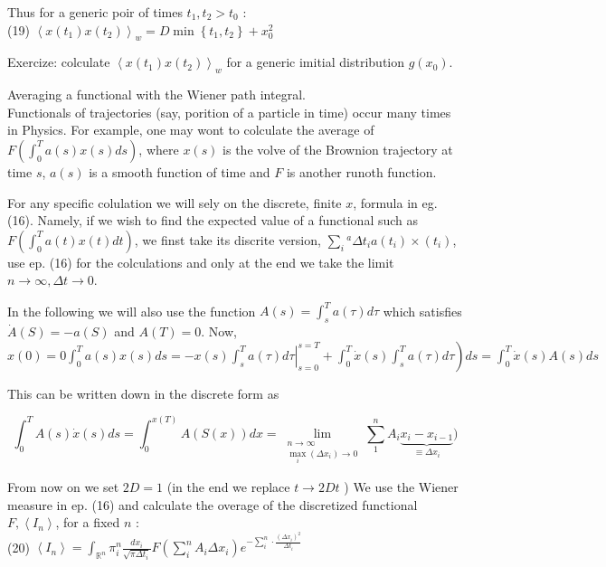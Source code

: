 \documentclass[10pt]{article}
\begin{document}
Thus for a generic poir of times $t_{1}, t_{2}>t_{0}$ :\\
(19) $\left\langle x\left(t_{1}\right) x\left(t_{2}\right)\right\rangle_{w}=D \min \left\{t_{1}, t_{2}\right\}+x_{0}^{2}$

Exercize: colculate $\left\langle x\left(t_{1}\right) x\left(t_{2}\right)\right\rangle_{w}$ for a generic imitial distribution $g\left(x_{0}\right)$.

Averaging a functional with the Wiener path integral.\\
Functionals of trajectories (say, porition of a particle in time) occur many times in Physics. For example, one may wont to colculate the average of $F\left(\int_{0}^{T} a(s) x(s) d s\right)$, where $x(s)$ is the volve of the Brownion trajectory at time $s$, $a(s)$ is a smooth function of time and $F$ is another runoth function.

For any specific colulation we will sely on the discrete, finite $x$, formula in eg. (16). Namely, if we wish to find the expected value of a functional such as $F\left(\int_{0}^{T} a(t) x(t) d t\right)$, we finst take its discrite version, $\sum_{i}{ }^{a} \Delta t_{i} a\left(t_{i}\right) \times\left(t_{i}\right)$, use ep. (16) for the colculations and only at the end we take the limit $n \rightarrow \infty, \Delta t \rightarrow 0$.

In the following we will also use the function $A(s)=\int_{s}^{T} a(\tau) d \tau$ which satisfies $\dot{A}(S)=-a(S)$ and $A(T)=0$. Now, $x(0)=0 \left.\int_{0}^{T} a(s) x(s) d s=-\left.x(s) \int_{s}^{T} a(\tau) d \tau\right|_{s=0} ^{s=T}+\int_{0}^{T} \dot{x}(s) \int_{s}^{T} a(\tau) d \tau\right) d s=\int_{0}^{T} \dot{x}(s) A(s) d s$

This can be written down in the discrete form as

$$
\int_{0}^{T} A(s) \dot{x}(s) d s=\int_{0}^{x(T)} A(S(x)) d x=\lim _{\substack{n \rightarrow \infty \\ \max _{i}\left(\Delta x_{i}\right) \rightarrow 0}} \sum_{1}^{n} A_{i} \underbrace{x_{i}-x_{i-1}}_{\equiv \Delta x_{i}})
$$

From now on we set $2 D=1$ (in the end we replace $t \rightarrow 2 D t$ ) We use the Wiener measure in ep. (16) and calculate the overage of the discretized functional $F,\left\langle I_{n}\right\rangle$, for a fixed $n$ :\\
(20) $\left\langle I_{n}\right\rangle=\int_{\mathbb{R}^{n}} \pi_{i}^{n} \frac{d x_{i}}{\sqrt{\pi \Delta t_{i}}} F\left(\sum_{i}^{n} A_{i} \Delta x_{i}\right) e^{-\sum_{i}^{n} \cdot \frac{\left(\Delta x_{i}\right)^{2}}{\Delta t_{i}}}$
\end{document}
